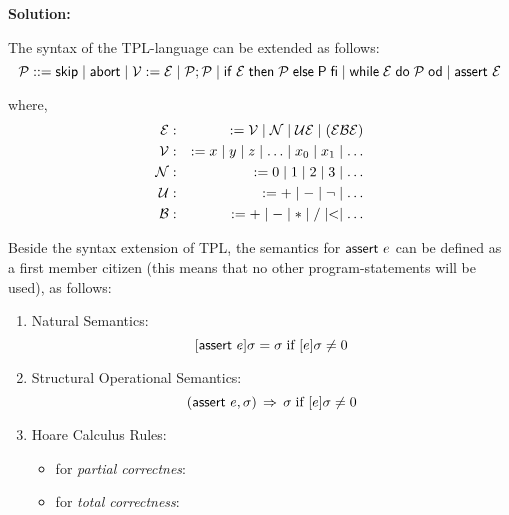 \textbf{Solution:}\newline

The syntax of the TPL-language can be extended as follows:%
\begin{equation*}
\mathcal{P}::=\mathsf{skip}\mid \mathsf{abort}\mid \mathcal{V}:=\mathcal{E}%
\mid \mathcal{P};\mathcal{P}\mid \mathsf{if}\;\mathcal{E}\;\mathsf{then}\;%
\mathcal{P}\;\mathsf{else}\;\mathsf{P}\;\mathsf{fi}\mid \mathsf{while}\;%
\mathcal{E}\;\mathsf{do}\;\mathcal{P}\;\mathsf{od}\mid \kw{assert}\ \mathcal{%
E}
\end{equation*}

where,%
\begin{eqnarray*}
\mathcal{E} &:&:=\mathcal{V}\mid \mathcal{N}\mid \mathcal{UE}\mid (\mathcal{%
EBE}) \\
\mathcal{V} &:&:=x\mid y\mid z\mid \ldots \mid x_{0}\mid x_{1}\mid \ldots  \\
\mathcal{N} &:&:=0\mid 1\mid 2\mid 3\mid \ldots  \\
\mathcal{U} &:&:=+\mid -\mid \lnot \mid \ldots  \\
\mathcal{B} &:&:=+\mid -\mid \ast \mid /\mid <\mid \ldots 
\end{eqnarray*}

Beside the syntax extension of TPL, the semantics for $\mbox{\sffamily assert}\ e$ can
be defined as a first member citizen (this means that no other
program-statements will be used), as follows:

\begin{enumerate}
\item Natural Semantics:%
\begin{equation*}
\lbrack \mbox{\sffamily assert}\ e\rbrack\sigma =\sigma \;\text{if }[e]\sigma \neq 0
\end{equation*}

\item Structural Operational Semantics:%
\begin{equation*}
(\mbox{\sffamily assert}\ e,\sigma )\,\Rightarrow \,\sigma \;\text{if }[e]\sigma \neq 0
\end{equation*}

\item Hoare Calculus Rules:
	\begin{itemize}
	\item for \textit{partial correctnes}:
	


	\item for \textit{total correctness}:
	\end{itemize}
\end{enumerate}
